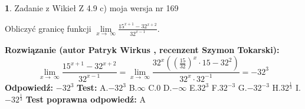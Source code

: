 \documentclass[12pt, a4paper]{article}
\theoremstyle{definition} %
\newtheorem{zad}{}
\newcommand{\zadStart}[1]{\begin{zad}#1\newline}
\newcommand{\zadStop}{\end{zad}}
\newcommand{\rozwStart}[2]{\noindent \textbf{Rozwiązanie (autor #1 , recenzent #2): }\newline}
\newcommand{\rozwStop}{\newline}
\newcommand{\odpStart}{\noindent \textbf{Odpowiedź:}\newline}
\newcommand{\odpStop}{\newline}
\newcommand{\testStart}{\noindent \textbf{Test:}\newline}
\newcommand{\testStop}{\newline}
\newcommand{\kluczStart}{\noindent \textbf{Test poprawna odpowiedź:}\newline}
\newcommand{\kluczStop}{\newline}
\begin{document}
\zadStart{Zadanie z Wikieł Z 4.9 c) moja wersja nr 169}


Obliczyć granicę funkcji  $\lim\limits_{x\to\ \infty}\frac{15^{x+1}-32^{x+2}}{32^{x-1}}$.
\zadStop
\rozwStart{Patryk Wirkus}{Szymon Tokarski}
$$\lim\limits_{x\to\ \infty}\frac{15^{x+1}-32^{x+2}}{32^{x-1}}=\lim\limits_{x\to\ \infty}\frac{32^{x}((\frac{15}{32})^{x}\cdot 15 -32^{2})}{32^{x}\cdot 32^{-1}} = -32^{3}$$
\rozwStop
\odpStart
$-32^{3}$
\odpStop
\testStart
A.$-32^{3}$ B.$\infty$ C.$0$ D.$-\infty$ E.$32^{3}$
F.$32^{-3}$ G.$-32^{-3}$
H.$32^{\frac{1}{3}}$
I.$-32^{\frac{1}{3}}$
\testStop
\kluczStart
A
\kluczStop
\end{document}
